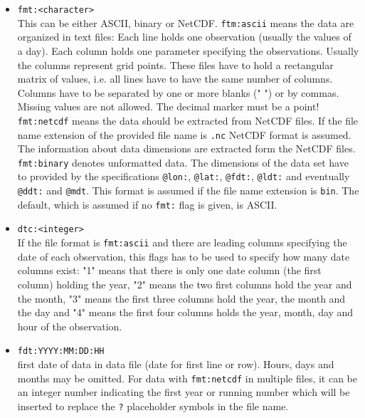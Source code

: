 \documentclass[12pt, oneside, a4paper, headsepline, plainheadsepline]{scrbook}
\begin{document}
\begin{itemize}
\item \verb+fmt:<character>+ \\
        This can be either ASCII, binary or NetCDF.
        \verb+ftm:ascii+ means the data are organized in text files:
        Each line holds one observation (usually the values of a day).
        Each column holds one parameter specifying the observations.
        Usually the columns represent grid points. These files have to
        hold a rectangular matrix of values, i.e. all lines have to
        have the same number of columns. Columns have to be separated
        by one or more blanks (" ") or by commas. Missing values are not allowed. 
        The decimal marker must be a point!\\
        \verb+fmt:netcdf+ means the data should be extracted from NetCDF files. If the 
        file name extension of the provided file name is \verb+.nc+ NetCDF format is assumed. 
        The information about data dimensions are extracted form the NetCDF files.
        \verb+fmt:binary+ denotes unformatted data. The dimensions of the data set have to provided 
        by the specifications \verb+@lon:+, \verb+@lat:+, \verb+@fdt:+, \verb+@ldt:+ and eventually
        \verb+@ddt:+ and \verb+@mdt+. This format is assumed if the file name extension is \verb+bin+.
        The default, which is assumed if no \verb+fmt:+ flag is given, is ASCII.

\item \verb+dtc:<integer>+ \\
        If the file format is \verb+fmt:ascii+ and there are leading columns
        specifying the date of each observation, this flags has to be used
        to specify how many date columns exist: "1" means that there is only
        one date column (the first column) holding the year, "2" means
        the two first columns hold the year and the month, "3" means the first
        three columns hold the year, the month and the day and "4" means the
        first four columns holds the year, month, day and hour of the observation.

\item \verb+fdt:YYYY:MM:DD:HH+ \\
		first date of data in data file (date for first line or row). Hours, days and months may be omitted.
		For data with \verb+fmt:netcdf+ in multiple files, it can be an integer number indicating the first year
		or running number which will be inserted to replace the \verb+?+ placeholder symbols in the file name.


\end{itemize}
\end{document}
